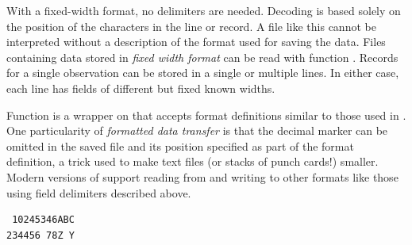 \documentclass[krantz2]{krantz}\usepackage{knitr}
\begin{document}
With a fixed-width format, no delimiters are needed. Decoding is based solely on the position of the characters in the line or record. A file like this cannot be interpreted without a description of the format used for saving the data. Files containing data stored in \emph{fixed width format} can be read with function . Records for a single observation can be stored in a single or multiple lines. In either case, each line has fields of different but fixed known widths.

Function  is a wrapper on  that accepts format definitions similar to those used in . One particularity of  \emph{formatted data transfer} is that the decimal marker can be omitted in the saved file and its position specified as part of the format definition, a trick used to make text files (or stacks of punch cards!) smaller. Modern versions of  support reading from and writing to other formats like those using field delimiters described above.

\begin{knitrout}\footnotesize
{}\color{fgcolor}\begin{kframe}
\begin{verbatim}
 10245346ABC
234456 78Z Y
\end{verbatim}
\end{kframe}
\end{knitrout}

\begin{knitrout}\footnotesize
{}\color{fgcolor}\begin{kframe}
\begin{alltt}
 \hlkwb{<-} \hlstd{(}\hlstd{,}
                               \hlstd{=} \hlstd{(}\hlstd{,} \hlstd{,} \hlstd{),}
                               \hlstd{=} \hlstd{(}\hlstd{,} \hlstd{,} \hlstd{,} \hlstd{))}
\end{alltt}
\end{kframe}
\end{knitrout}
\end{document}
